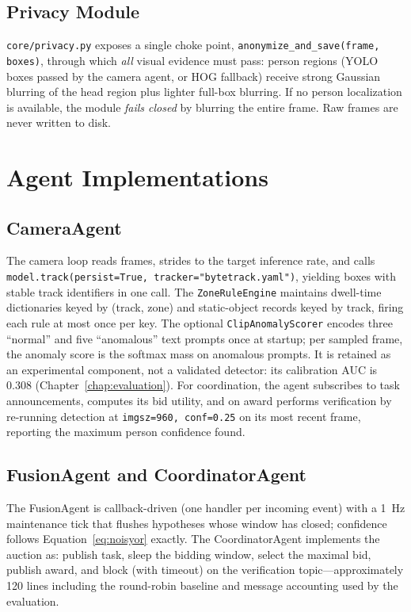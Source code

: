 \subsection{Privacy Module}

\texttt{core/privacy.py} exposes a single choke point, \texttt{anonymize\_and\_save(frame, boxes)}, through which \emph{all} visual evidence must pass: person regions (YOLO boxes passed by the camera agent, or HOG fallback) receive strong Gaussian blurring of the head region plus lighter full-box blurring. If no person localization is available, the module \emph{fails closed} by blurring the entire frame. Raw frames are never written to disk.

\section{Agent Implementations}

\subsection{CameraAgent}

The camera loop reads frames, strides to the target inference rate, and calls \texttt{model.track(persist=True, tracker="bytetrack.yaml")}, yielding boxes with stable track identifiers in one call. The \texttt{ZoneRuleEngine} maintains dwell-time dictionaries keyed by (track, zone) and static-object records keyed by track, firing each rule at most once per key. The optional \texttt{ClipAnomalyScorer} encodes three ``normal'' and five ``anomalous'' text prompts once at startup; per sampled frame, the anomaly score is the softmax mass on anomalous prompts. It is retained as an experimental component, not a validated detector: its calibration AUC is 0.308 (Chapter~\ref{chap:evaluation}). For coordination, the agent subscribes to task announcements, computes its bid utility, and on award performs verification by re-running detection at \texttt{imgsz=960, conf=0.25} on its most recent frame, reporting the maximum person confidence found.

\subsection{FusionAgent and CoordinatorAgent}

The FusionAgent is callback-driven (one handler per incoming event) with a 1~Hz maintenance tick that flushes hypotheses whose window has closed; confidence follows Equation~\ref{eq:noisyor} exactly. The CoordinatorAgent implements the auction as: publish task, sleep the bidding window, select the maximal bid, publish award, and block (with timeout) on the verification topic---approximately 120 lines including the round-robin baseline and message accounting used by the evaluation.

